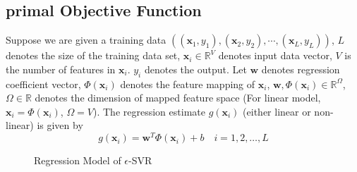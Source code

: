 \subsection{primal Objective Function}\label{DualityForm}
  Suppose we are given a training data $((\mathbf{x}_{1}, y_{1}),(\mathbf{x}_{2},y_{2}),\cdots,(\mathbf{x}_{L},y_{L}))$, $L$ denotes the size of the training data set, $\mathbf{x}_{i}\in \mathbb{R}^{V}$ denotes input data vector, $V$ is the number of features in $\mathbf{x}_{i}$. $y_{i}$ denotes the output. Let $\mathbf{w}$ denotes regression coefficient vector, $\Phi(\mathbf{x}_{i})$ denotes the feature mapping of $\mathbf{x}_{i}$, $\mathbf{w},\Phi(\mathbf{x}_{i})\in \mathbb{R}^{\Omega}$, $\Omega \in \mathbb{R}$ denotes the dimension of mapped feature space (For linear model, $\mathbf{x}_{i}=\Phi(\mathbf{x}_{i})$, $\Omega=V$). The regression estimate $g(\mathbf{x}_{i})$ (either linear or non-linear) is given by 
\begin{equation}
g(\mathbf{x}_{i})=\mathbf{w}^{T}\Phi(\mathbf{x}_{i})+b  \quad i= 1,2,\ldots, L
\label{regression estimates}
\end{equation} 
\begin{figure}
\centering
\def\svgwidth{\columnwidth}

\caption{Regression Model of $\epsilon$-SVR}
\label{regression model}
\end{figure}

